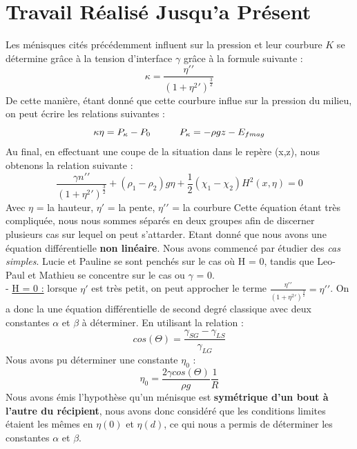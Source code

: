 \documentclass{article}
\begin{document}
\section{Travail Réalisé Jusqu'a Présent}
Les ménisques cités précédemment influent sur la pression et leur courbure $K$ se détermine grâce à la tension d'interface $\gamma$ grâce à la formule suivante :
\begin{equation}
\kappa= \frac{\eta\prime\prime}{(1+\eta^{2}\prime)^{\frac{3}{2}}}
\label{eq01}
\end{equation}
De cette manière, étant donné que cette courbure influe sur la pression du milieu, on peut écrire les relations suivantes :
\begin{equation}
\kappa\eta = P_{\kappa} - P_{0} \indent \indent 
P_{\kappa} = -\rho gz- E_{fmag}
\label{eq02}
\end{equation}
Au final, en effectuant une coupe de la situation dans le repère (x,z), nous obtenons la relation suivante : 
\begin{equation}
\frac{\gamma n\prime\prime}{(1+\eta^{2}\prime)^{\frac{3}{2}}} + (\rho_{1} - \rho_{2})g\eta + \frac{1}{2}(\chi_{1} - \chi_{2})H^{2}(x,\eta)=0
\label{eq03}
\end{equation}
Avec $\eta$ = la hauteur, $\eta\prime$ = la pente, $\eta\prime\prime$ = la courbure 
\newline
Cette équation étant très compliquée, nous nous sommes séparés en deux groupes afin de discerner plusieurs cas sur lequel on peut s'attarder.
\newline
Etant donné que nous avons une équation différentielle \textbf{non linéaire}. Nous avons commencé par étudier des \textit{cas simples}.  Lucie et Pauline se sont penchés sur le cas où H = 0, tandis que Leo-Paul et Mathieu se concentre sur le cas ou $\gamma$ = 0. \\
\newline
- \underline{H = 0 :} lorsque $\eta\prime$ est très petit, on peut approcher le terme $\frac{\eta\prime\prime}{(1+\eta^{2}\prime)^{\frac{3}{2}}} = \eta\prime\prime$. On a donc la une équation différentielle de second degré classique avec deux constantes $\alpha$ et $\beta$ à déterminer. En utilisant la relation :
\begin{equation}
cos(\Theta) = \frac{\gamma_{SG}-\gamma_{LS}}{\gamma_{LG}}
\label{eq04}
\end{equation}
Nous avons pu déterminer une constante $\eta_{0}$ :
\begin{equation}
\eta_{0} = \frac{2\gamma cos(\Theta)}{\rho g}\frac{1}{R}
\label{eq05}
\end{equation}
Nous avons émis l'hypothèse qu'un ménisque est \textbf{symétrique d'un bout à l'autre du récipient}, nous avons donc considéré que les conditions limites étaient les mêmes en $\eta(0)$ et $\eta(d)$, ce qui nous a permis de déterminer les constantes $\alpha$ et $\beta$. 
\end{document}
